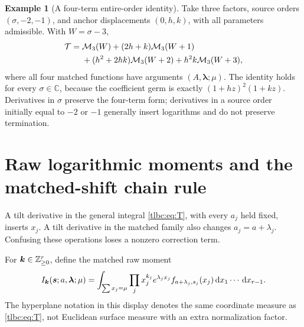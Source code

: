 \documentclass[11pt,letterpaper]{article}
\numberwithin{equation}{section}
\theoremstyle{definition}\newtheorem{definition}[theorem]{Definition}
\newtheorem{example}[theorem]{Example}
\theoremstyle{remark}\newtheorem{remark}[theorem]{Remark}
\newcommand{\C}{\mathbb C}\newcommand{\R}{\mathbb R}\newcommand{\Q}{\mathbb Q}\newcommand{\Z}{\mathbb Z}
\newcommand{\dd}{\,\mathrm d}\newcommand{\ii}{\mathrm i}
\newcommand{\M}{\mathcal M}\newcommand{\T}{\mathcal T}\newcommand{\K}{\mathcal K}
\newcommand{\bs}{\boldsymbol s}\newcommand{\ba}{\boldsymbol a}\newcommand{\bl}{\boldsymbol\lambda}
\begin{document}
\begin{example}[A four-term entire-order identity]\label{tlbc:ex:finite}
Take three factors, source orders $(\sigma,-2,-1)$, and anchor displacements $(0,h,k)$, with all parameters admissible. With $W=\sigma-3$,
\begin{align}\label{tlbc:eq:fourterm}
 \T={}&\M_3(W)+(2h+k)\M_3(W+1)\notag\\
      &+(h^2+2hk)\M_3(W+2)+h^2k\M_3(W+3),
\end{align}
where all four matched functions have arguments $(A,\bl;\mu)$. The identity holds for every $\sigma\in\C$, because the coefficient germ is exactly $(1+hz)^2(1+kz)$. Derivatives in $\sigma$ preserve the four-term form; derivatives in a source order initially equal to $-2$ or $-1$ generally insert logarithms and do not preserve termination.
\end{example}

\section{Raw logarithmic moments and the matched-shift chain rule}
\label{tlbc:sec:moments}
A tilt derivative in the general integral \eqref{tlbc:eq:T}, with every $a_j$ held fixed, inserts $x_j$. A tilt derivative in the matched family also changes $a_j=a+\lambda_j$. Confusing these operations loses a nonzero correction term.

For $\bk\in\Z_{\ge0}^r$, define the matched raw moment
\begin{equation}\label{tlbc:eq:rawmoment}
 I_{\bk}(\bs;a,\bl;\mu)
 =\int_{\sum x_j=\mu}\prod_j x_j^{k_j}e^{\lambda_jx_j}
       f_{a+\lambda_j,s_j}(x_j)\dd x_1\cdots\dd x_{r-1}.
\end{equation}
The hyperplane notation in this display denotes the same coordinate measure as \eqref{tlbc:eq:T}, not Euclidean surface measure with an extra normalization factor.
\end{document}
